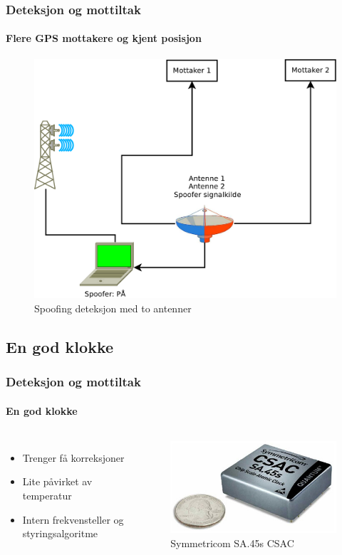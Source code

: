 \documentclass[xcolor=table]{beamer}
\begin{document}
\begin{frame} 
\frametitle{Deteksjon og mottiltak}
  \framesubtitle{Flere GPS mottakere og kjent posisjon}
  \begin{figure}
    \includegraphics[scale=0.23]{thesis/graphics/toantenner_2.pdf}
    \caption{Spoofing deteksjon med to antenner}
  \end{figure}
\end{frame}

\subsection{En god klokke}
\begin{frame}
\frametitle{Deteksjon og mottiltak}
  \framesubtitle{En god klokke}
  \begin{columns}
    \begin{itemize}
          \setlength\itemsep{2em}
      \item Trenger få korreksjoner
      \item Lite påvirket av temperatur
      \item Intern frekvensteller og styringsalgoritme
    \end{itemize}
      \begin{figure}
        \includegraphics[scale=0.2]{thesis/graphics/csac.jpg}
      \caption{Symmetricom SA.45s CSAC \cite{SADS}}
    \end{figure}
  \end{columns}
\end{frame}
\end{document}
